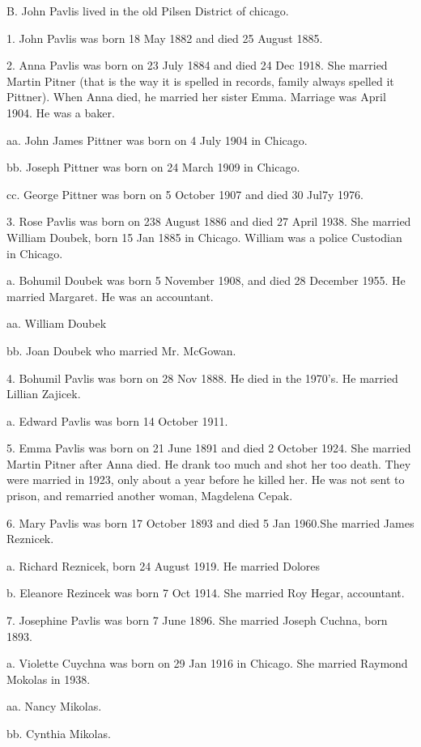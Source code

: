 \documentclass[a4paper]{article}
\begin{document}
B. John Pavlis lived in the old Pilsen District of chicago.  

1. John Pavlis was born 18 May 1882 and died 25 August 1885.

2. Anna Pavlis was born on 23 July 1884 and died 24 Dec 1918.  She married Martin Pitner (that is the way it is spelled in records, family always spelled it Pittner).  When Anna died, he married her sister Emma.  Marriage was April 1904.  He was a baker.  

aa. John James Pittner was born on 4 July 1904 in Chicago.

bb. Joseph Pittner was born on 24 March 1909 in Chicago.

cc. George Pittner was born on 5 October 1907 and died 30 Jul7y 1976.

3. Rose Pavlis was born on 238 August 1886 and died 27 April 1938.  She married William Doubek, born 15 Jan 1885 in Chicago.  William was a police Custodian in Chicago.  

a. Bohumil Doubek was born 5 November 1908, and died 28 December 1955.  He married Margaret.  He was an accountant.

aa. William Doubek

bb. Joan Doubek who married Mr. McGowan.

4. Bohumil Pavlis was born on 28 Nov 1888.  He died in the 1970's. He married Lillian Zajicek.  

a. Edward Pavlis was born 14 October 1911.  

5. Emma Pavlis was born on 21 June 1891 and died 2 October 1924.  She married Martin Pitner after Anna died.  He drank too much and shot her too death. They were married in 1923, only about a year before he killed her.  He was not sent to prison, and remarried another woman, Magdelena Cepak.  

6. Mary Pavlis was born 17 October 1893 and died 5 Jan 1960.She married James Reznicek.

a. Richard Reznicek, born 24 August 1919.  He married Dolores

b. Eleanore Rezincek was born 7 Oct 1914.  She married Roy Hegar, accountant.

7. Josephine Pavlis was born 7 June 1896.  She married Joseph Cuchna, born 1893.  

a. Violette Cuychna was born on 29 Jan 1916 in Chicago.  She married Raymond Mokolas in 1938.

aa. Nancy Mikolas.

bb. Cynthia Mikolas.
\end{document}
